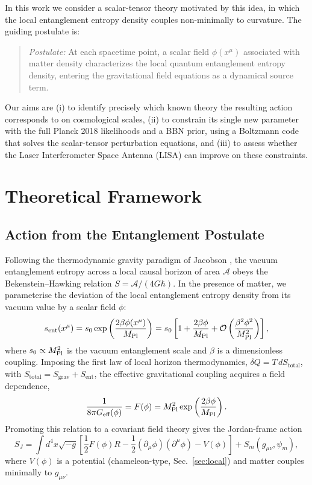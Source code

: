 \documentclass[11pt,a4paper]{article}
\begin{document}
In this work we consider a scalar-tensor theory motivated by this idea, in which the local entanglement entropy density couples non-minimally to curvature. The guiding postulate is:
\begin{quote}
\textit{Postulate:} At each spacetime point, a scalar field $\phi(x^\mu)$ associated with matter density characterizes the local quantum entanglement entropy density, entering the gravitational field equations as a dynamical source term.
\end{quote}

Our aims are (i) to identify precisely which known theory the resulting action corresponds to on cosmological scales, (ii) to constrain its single new parameter with the full Planck 2018 likelihoods and a BBN prior, using a Boltzmann code that solves the scalar-tensor perturbation equations, and (iii) to assess whether the Laser Interferometer Space Antenna (LISA) can improve on these constraints.

\section{Theoretical Framework}

\subsection{Action from the Entanglement Postulate}
Following the thermodynamic gravity paradigm of Jacobson \cite{Jacobson1995}, the vacuum entanglement entropy across a local causal horizon of area $\mathcal{A}$ obeys the Bekenstein--Hawking relation $S = \mathcal{A}/(4G\hbar)$. In the presence of matter, we parameterise the deviation of the local entanglement entropy density from its vacuum value by a scalar field $\phi$:
\begin{equation}
s_{\text{ent}}(x^\mu) = s_0 \exp\left( \frac{2\beta \phi(x^\mu)}{M_{\rm Pl}} \right) = s_0 \left[ 1 + \frac{2\beta \phi}{M_{\rm Pl}} + \mathcal{O}\left(\frac{\beta^2 \phi^2}{M_{\rm Pl}^2}\right) \right],
\label{eq:entropy_density}
\end{equation}
where $s_0 \propto M_{\rm Pl}^2$ is the vacuum entanglement scale and $\beta$ is a dimensionless coupling. Imposing the first law of local horizon thermodynamics, $\delta Q = T\, dS_{\text{total}}$, with $S_{\text{total}} = S_{\text{grav}} + S_{\text{ent}}$, the effective gravitational coupling acquires a field dependence,
\begin{equation}
\frac{1}{8\pi G_{\text{eff}}(\phi)} = F(\phi) = M_{\rm Pl}^2 \exp\left( \frac{2\beta \phi}{M_{\rm Pl}} \right).
\end{equation}
Promoting this relation to a covariant field theory gives the Jordan-frame action
\begin{equation}
S_J = \int d^4x \sqrt{-g} \left[ \frac{1}{2} F(\phi) R - \frac{1}{2} (\partial_\mu \phi)(\partial^\mu \phi) - V(\phi) \right] + S_m(g_{\mu\nu}, \psi_m),
\label{eq:action_jordan}
\end{equation}
where $V(\phi)$ is a potential (chameleon-type, Sec.~\ref{sec:local}) and matter couples minimally to $g_{\mu\nu}$.
\end{document}
